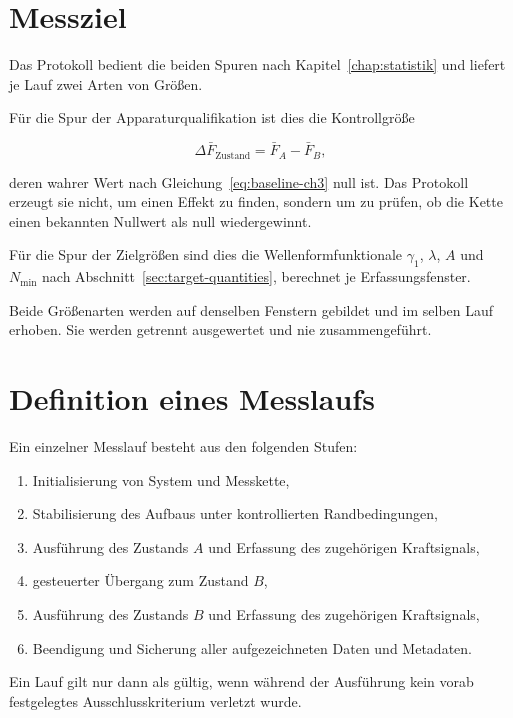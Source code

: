 \documentclass[12pt,a4paper]{report}
\begin{document}
\section{Messziel}

Das Protokoll bedient die beiden Spuren nach
Kapitel~\ref{chap:statistik} und liefert je Lauf zwei Arten von Größen.

Für die Spur der Apparaturqualifikation ist dies die Kontrollgröße

\begin{equation}
\Delta \bar{F}_{\text{Zustand}} = \bar{F}_{A} - \bar{F}_{B},
\end{equation}

deren wahrer Wert nach Gleichung~\eqref{eq:baseline-ch3} null ist. Das
Protokoll erzeugt sie nicht, um einen Effekt zu finden, sondern um zu
prüfen, ob die Kette einen bekannten Nullwert als null wiedergewinnt.

Für die Spur der Zielgrößen sind dies die Wellenformfunktionale
$\gamma_1$, $\lambda$, $A$ und $N_{\min}$ nach
Abschnitt~\ref{sec:target-quantities}, berechnet je Erfassungsfenster.

Beide Größenarten werden auf denselben Fenstern gebildet und im selben
Lauf erhoben. Sie werden getrennt ausgewertet und nie zusammengeführt.

\section{Definition eines Messlaufs}

Ein einzelner Messlauf besteht aus den folgenden Stufen:

\begin{enumerate}
\item Initialisierung von System und Messkette,
\item Stabilisierung des Aufbaus unter kontrollierten Randbedingungen,
\item Ausführung des Zustands $A$ und Erfassung des zugehörigen
      Kraftsignals,
\item gesteuerter Übergang zum Zustand $B$,
\item Ausführung des Zustands $B$ und Erfassung des zugehörigen
      Kraftsignals,
\item Beendigung und Sicherung aller aufgezeichneten Daten und
      Metadaten.
\end{enumerate}

Ein Lauf gilt nur dann als gültig, wenn während der Ausführung kein
vorab festgelegtes Ausschlusskriterium verletzt wurde.
\end{document}

